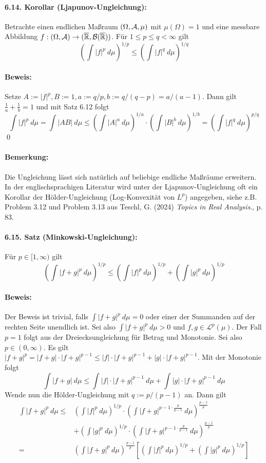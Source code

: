 \documentclass[12pt]{report}
\begin{document}
\paragraph{6.14. Korollar (Ljapunov-Ungleichung):}Betrachte einen endlichen Ma\ss{}raum $(\Omega,\mathcal{A},\mu)$ mit $\mu(\Omega)=1$ und eine messbare Abbildung $f:(\Omega,\mathcal{A})\to(\overline{\mathbb{R}},\mathcal{B}(\overline{\mathbb{R}}))$. F\"ur $1\leq p\leq q<\infty$ gilt
$$\left(\int |f|^p\ d\mu\right)^{1/p}\leq\left(\int |f|^q\ d\mu\right)^{1/q}$$
 
 \paragraph{Beweis:}Setze $A:=|f|^p, B:=1, a:=q/p, b:=q/(q-p)=a/(a-1)$. Dann gilt $\frac{1}{a}+\frac{1}{b}=1$ und mit Satz 6.12 folgt
 $$\int |f|^p\ d\mu=\int |AB|\ d\mu\leq\left(\int |A|^a\ d\mu\right)^{1/a}\cdot\left(\int |B|^b\ d\mu\right)^{1/b}=\left(\int |f|^q\ d\mu\right)^{p/q}$$
 \qed
 
 \paragraph{Bemerkung:} Die Ungleichung l\"asst sich nat\"urlich auf beliebige endliche Ma\ss{}r\"aume erweitern. In der englischsprachigen Literatur wird unter der Ljapunov-Ungleichung oft ein Korollar der H\"older-Ungleichung (Log-Konvexit\"at von $L^p$) angegeben, siehe z.B. Problem 3.12  und Problem 3.13 aus Teschl, G. (2024) \textit{Topics in Real Analysis}., p. 83. 
 
 \paragraph{6.15. Satz (Minkowski-Ungleichung):}F\"ur $p\in[1,\infty)$ gilt
 $$\left(\int|f+g|^p\ d\mu\right)^{1/p}\leq\left(\int |f|^p\ d\mu\right)^{1/p}+\left(\int |g|^p\ d\mu\right)^{1/p}$$
 
 \paragraph{Beweis:}Der Beweis ist trivial, falls $\displaystyle\int |f+g|^p\ d\mu=0$ oder einer der Summanden auf der rechten Seite unendlich ist. Sei also $\displaystyle\int |f+g|^p\ d\mu>0$ und $f,g\in\mathcal{L}^p(\mu)$. Der Fall $p=1$ folgt aus der Dreiecksungleichung f\"ur Betrag und Monotonie. Sei also $p\in(0,\infty)$. Es gilt $|f+g|^p=|f+g|\cdot|f+g|^{p-1}\leq|f|\cdot|f+g|^{p-1}+|g|\cdot|f+g|^{p-1}$. Mit der Monotonie folgt
 $$\int|f+g|\ d\mu\leq\int |f|\cdot|f+g|^{p-1}\ d\mu+\int |g|\cdot|f+g|^{p-1}\ d\mu$$
 Wende nun die H\"older-Ungleichung mit $q:=p/(p-1)$ an. Dann gilt
 \begin{align*}
     \int|f+g|^p\ d\mu
     \leq& \left(\int |f|^p\ d\mu\right)^{1/p}\cdot\left(\int |f+g|^{p-1\cdot\frac{p}{p-1}}\ d\mu\right)^{\frac{p-1}{p}}\\&+\left(\int |g|^p\ d\mu\right)^{1/p}\cdot\left(\int |f+g|^{p-1\cdot\frac{p}{p-1}}\ d\mu\right)^{\frac{p-1}{p}}\\
     =&\left(\int |f+g|^p\ d\mu\right)^{\frac{p-1}{p}}\left[\left(\int |f|^p\ d\mu\right)^{1/p}+\left(\int |g|^p\ d\mu\right)^{1/p}\right]
 \end{align*}
 
\end{document}
